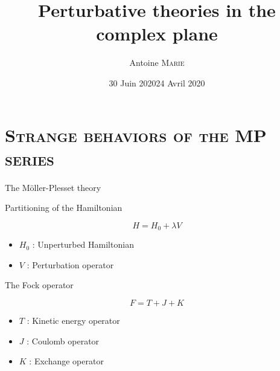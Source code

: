 \documentclass[xcolor=x11names,compress]{beamer}
\title[Title]{Perturbative theories in the complex plane}
\author[]{Antoine \textsc{Marie}}
\date{30 Juin 2020}
\institute{Supervised by Pierre-François \textsc{LOOS}}
\renewcommand{\(}{\begin{columns}}
\renewcommand{\)}{\end{columns}}
\newcommand{\<}[1]{\begin{column}{#1}}
\renewcommand{\>}{\end{column}}
\begin{document}

\begin{frame}[plain]

\date{24 Avril 2020}
\titlepage
\end{frame}


\section{\textsc{Strange behaviors of the MP series}}

\begin{frame}{The Möller-Plesset theory}

\begin{beamerboxesrounded}[scheme=foncé]{\centering Partitioning of the Hamiltonian}

\begin{equation}
   H = H_0 + \lambda V
\end{equation}

\end{beamerboxesrounded}

\begin{itemize}
\centering
    \item $H_0$ : Unperturbed Hamiltonian
    \item $V$ : Perturbation operator
\end{itemize}

\begin{beamerboxesrounded}[scheme=foncé]{\centering The Fock operator}

\begin{equation}
   F = T + J + K
\end{equation}
\end{beamerboxesrounded}

\begin{itemize}
\centering
    \item $T$ : Kinetic energy operator
    \item $J$ : Coulomb operator
    \item $K$ : Exchange operator
\end{itemize}
    
\end{frame}
\end{document}
